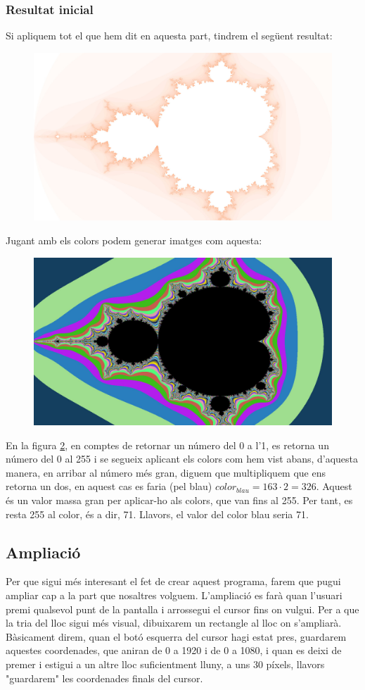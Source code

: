 \subsubsection*{Resultat inicial}
Si apliquem tot el que hem dit en aquesta part, tindrem el següent resultat:
\begin{figure}[h!]
    \centering
    \includegraphics[width=.65\linewidth]{imatges/Captured_On_Mon_Dec__6_18-48-29_2021-.jpg}
    \label{fig:resultat_inicial}
\end{figure}
\n \noindent
Jugant amb els colors podem generar imatges com aquesta:
\begin{figure}[h!]
    \centering
    \includegraphics[width=.65\linewidth]{imatges/Captured_On_Sat_Aug__7_16-04-10_2021-.jpg}
    \label{fig:jugant_amb_colors}
\end{figure}
\n \noindent
En la figura \ref{fig:jugant_amb_colors}, en comptes de retornar un número del 0 a l'1, es retorna un número del 0 al 255 i se segueix aplicant els colors com hem vist abans, d'aquesta manera, en arribar al número més gran, diguem que multipliquem que ens retorna un dos, en aquest cas es faria (pel blau) $color_{blau} = 163 \cdot 2 = 326$. Aquest és un valor massa gran per aplicar-ho als colors, que van fins al 255. Per tant, es resta 255 al color, és a dir, 71. Llavors, el valor del color blau seria 71.

\subsection{Ampliació}
Per que sigui més interesant el fet de crear aquest programa, farem que pugui ampliar cap a la part que nosaltres volguem. \n
L'ampliació es farà quan l'usuari premi qualsevol punt de la pantalla i arrossegui el cursor fins on vulgui. \n Per a que la tria del lloc sigui més visual, dibuixarem un rectangle al lloc on s'ampliarà. \n
Bàsicament direm, quan el botó esquerra del cursor hagi estat pres, guardarem aquestes coordenades, que aniran de 0 a 1920 i de 0 a 1080, i quan es deixi de premer i estigui a un altre lloc suficientment lluny, a uns 30 píxels, llavors "guardarem" les coordenades finals del cursor.
